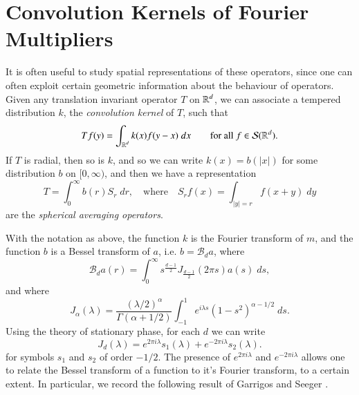 \section{Convolution Kernels of Fourier Multipliers}

It is often useful to study spatial representations of these operators, since one can often exploit certain geometric information about the behaviour of operators. Given any translation invariant operator $T$ on $\operatorname{\mathbb{R}}^d$, we can associate a tempered distribution $k$, the \emph{convolution kernel} of $T$, such that
%
\begin{equation}
  Tf(y) = \int_{\operatorname{\mathbb{R}}^d} k(x) f(y-x)\; dx \quad\quad\text{for all $f \in \mathcal{S}(\operatorname{\mathbb{R}}^d)$}.
\end{equation}
%
If $T$ is radial, then so is $k$, and so we can write $k(x) = b(|x|)$ for some distribution $b$ on $[0,\infty)$, and then we have a representation
%
\begin{equation}
  T = \int_0^\infty b(r) S_r\; dr,\quad\text{where}\quad S_rf(x) = \int_{|y| = r} f(x + y)\; dy 
\end{equation}
%
are the \emph{spherical averaging operators}.

With the notation as above, the function $k$ is the Fourier transform of $m$, and the function $b$ is a Bessel transform of $a$, i.e. $b = \mathcal{B}_d a$, where
%
\begin{equation}
  \mathcal{B}_d a(r) = \int_0^\infty s^{\frac{d-1}{2}} J_{\frac{d-1}{2}}(2 \pi s) a(s)\; ds,
\end{equation}
%
%
and where
%
\begin{equation}
  J_\alpha(\lambda) = \frac{(\lambda / 2)^\alpha}{\Gamma(\alpha + 1/2)} \int_{-1}^1 e^{i \lambda s} (1 - s^2)^{\alpha - 1/2}\; ds.
\end{equation}
%
Using the theory of stationary phase, for each $d$ we can write
%
\begin{equation}
  J_d(\lambda) = e^{2 \pi i \lambda} s_1(\lambda) + e^{-2 \pi i \lambda} s_2(\lambda).
\end{equation}
%
for symbols $s_1$ and $s_2$ of order $-1/2$. The presence of $e^{2 \pi i \lambda}$ and $e^{-2 \pi i \lambda}$ allows one to relate the Bessel transform of a function to it's Fourier transform, to a certain extent. In particular, we record the following result of Garrigos and Seeger \cite{GarrigosandSeeger}.

